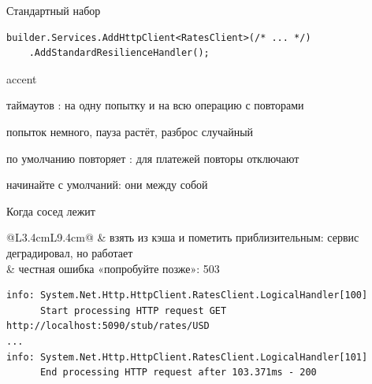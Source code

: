 \documentclass[aspectratio=169,10pt,t]{beamer}
\newcommand{\codesm}{\ttfamily\fontsize{7.6}{9.0}\selectfont}
\newcommand{\termsm}{\ttfamily\fontsize{6.6}{7.9}\selectfont}
\begin{document}
\begin{frame}[fragile]{Стандартный набор}
  \slidetop
\begin{lstlisting}[style=csharp,basicstyle=\codesm]
builder.Services.AddHttpClient<RatesClient>(/* ... */)
    .AddStandardResilienceHandler();
\end{lstlisting}

  \begin{center}
  \end{center}

  \begin{cbul}{accent}
    \item таймаутов : на одну попытку и на всю операцию с повторами
    \item попыток немного, пауза растёт, разброс случайный
    \item по умолчанию повторяет : для платежей повторы отключают
    \item начинайте с умолчаний: они  между собой
  \end{cbul}
\end{frame}

\begin{frame}[fragile]{Когда сосед лежит}
  \slidetop
  {\renewcommand{\arraystretch}{1.5}
  \begin{tabular}{@{}L{3.4cm}L{9.4cm}@{}}
     & взять из кэша и пометить приблизительным: сервис
      деградировал, но работает \\
          & честная ошибка «попробуйте позже»: 503 \\
  \end{tabular}}

  \slidegap
\begin{lstlisting}[style=term,basicstyle=\termsm]
info: System.Net.Http.HttpClient.RatesClient.LogicalHandler[100]
      Start processing HTTP request GET http://localhost:5090/stub/rates/USD
...
info: System.Net.Http.HttpClient.RatesClient.LogicalHandler[101]
      End processing HTTP request after 103.371ms - 200
\end{lstlisting}

\end{frame}

\begin{frame}[plain]
\end{frame}
\end{document}
